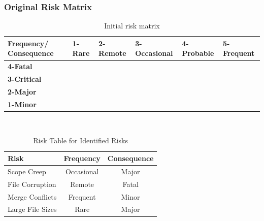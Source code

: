 \subsubsection{Original Risk Matrix}

\begin{table}[h]
\centering
\scriptsize
\caption{Initial risk matrix}
\begin{tabular}{|p{2cm}|p{2cm}|p{2cm}| p{2cm} |p{2cm}| p{2cm}|}
\hline \bf Frequency/ Consequence & \bf 1-Rare & \bf 2-Remote & \bf 3-Occasional & \bf 4-Probable & \bf 5-Frequent\\ [10pt]

\hline \bf 4-Fatal & \cellcolor{yellow!50} & \cellcolor{red!50} & \cellcolor{red!50} & \cellcolor{red!50} &\cellcolor{red!50} \\ [10pt]

\hline \bf 3-Critical &\cellcolor{green!50} & \cellcolor{yellow!50} & \cellcolor{yellow!50} & \cellcolor{red!50} &\cellcolor{red!50} \\ [10pt]

\hline \bf 2-Major & \cellcolor{green!50} & \cellcolor{green!50} & \cellcolor{yellow!50} &\cellcolor{yellow!50} &\cellcolor{red!50} \\ [10pt]

\hline \bf 1-Minor & \cellcolor{green!50} & \cellcolor{green!50} & \cellcolor{green!50} &\cellcolor{yellow!50} &\cellcolor{yellow!50} \\ [10pt]
\hline
\end{tabular} \\
\label{tab:ProjRisks}
\end{table}

\begin{table}[h]
\centering
\caption{Risk Table for Identified Risks}
\begin{tabular}{|l|c|c|}
\hline
\textbf{Risk}                           & \textbf{Frequency} & \textbf{Consequence} \\
\hline
\rowcolor{yellow!50} Scope Creep        & Occasional        & Major                 \\
\hline
\rowcolor{red!50} File Corruption       & Remote            & Fatal                 \\
\hline
\rowcolor{yellow!50} Merge Conflicts    & Frequent          & Minor               \\
\hline
\rowcolor{green!50} Large File Sizes   & Rare              & Major                 \\
\hline
\end{tabular}
\label{tab:ProjRisks}
\end{table}

